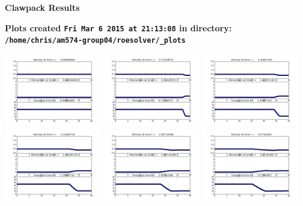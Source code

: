 \documentclass[11pt]{article}
\begin{document}
        \begin{center}{\Large\bf Clawpack Results}\vskip 5pt
        
        \bf Plots created {\tt Fri Mar  6 2015 at 21:13:08} in directory: \vskip 5pt
        \verb+/home/chris/am574-group04/roesolver/_plots+
        \end{center}
        \vskip 5pt
        \includegraphics[width=0.316666666667\textwidth]{frame0000fig1.png}
\vskip 10pt 
\includegraphics[width=0.316666666667\textwidth]{frame0001fig1.png}
\vskip 10pt 
\includegraphics[width=0.316666666667\textwidth]{frame0002fig1.png}
\vskip 10pt 
\includegraphics[width=0.316666666667\textwidth]{frame0003fig1.png}
\vskip 10pt 
\includegraphics[width=0.316666666667\textwidth]{frame0004fig1.png}
\vskip 10pt 
\includegraphics[width=0.316666666667\textwidth]{frame0005fig1.png}
\end{document}
